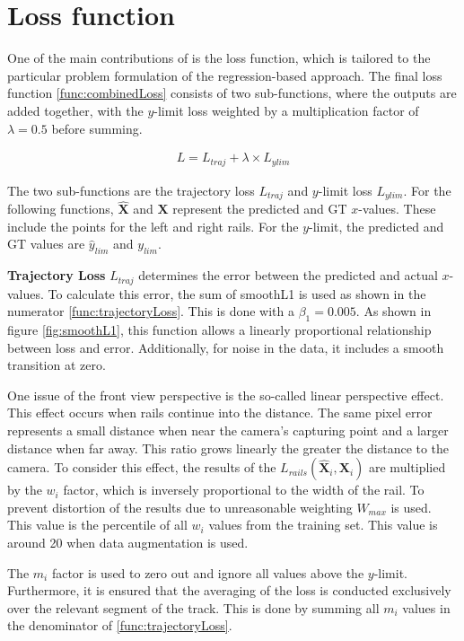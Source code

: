 \section{Loss function}
\label{sec:lossFunction}

One of the main contributions of \cite{tepNet2024} is the loss function, which is tailored to the particular problem formulation of the regression-based approach.
The final loss function \autoref{func:combinedLoss} \cite{tepNet2024} consists of two sub-functions, where the outputs are added together, with the $y$-limit loss weighted by a multiplication factor of $\lambda=0.5$ before summing.

\begin{align}
    L = L_{traj} + \lambda \times L_{ylim}
    \label{func:combinedLoss}
\end{align}

The two sub-functions are the trajectory loss $L_{traj}$ and $y$-limit loss $L_{ylim}$.
For the following functions, $\hat{\mathbf{X}}$ and $\mathbf{X}$ represent the predicted and \ac{GT} $x$-values.
These include the points for the left and right rails.
For the $y$-limit, the predicted and \ac{GT} values are $\hat{y}_{lim}$ and $y_{lim}$.

\textbf{Trajectory Loss} $L_{traj}$ determines the error between the predicted and actual $x$-values.
To calculate this error, the sum of smoothL1 is used as shown in the numerator \autoref{func:trajectoryLoss}.
This is done with a $\beta_{1} = 0.005$. As shown in figure \autoref{fig:smoothL1}, this function allows a linearly proportional relationship between loss and error.
Additionally, for noise in the data, it includes a smooth transition at zero.

One issue of the front view perspective is the so-called linear perspective effect.
This effect occurs when rails continue into the distance.
The same pixel error represents a small distance when near the camera's capturing point and a larger distance when far away.
This ratio grows linearly the greater the distance to the camera.
To consider this effect, the results of the $L_{rails}(\hat{\mathbf{X}}_{i},\mathbf{X}_{i})$ are multiplied by the $w_{i}$ factor, which is inversely proportional to the width of the rail.
To prevent distortion of the results due to unreasonable weighting $W_{max}$ is used.
This value is the %
percentile of all $w_{i}$ values from the training set.
This value is around 20 when data augmentation is used.

The $m_{i}$ factor is used to zero out and ignore all values above the $y$-limit.
Furthermore, it is ensured that the averaging of the loss is conducted exclusively over the relevant segment of the track.
This is done by summing all $m_{i}$ values in the denominator of \autoref{func:trajectoryLoss}.


